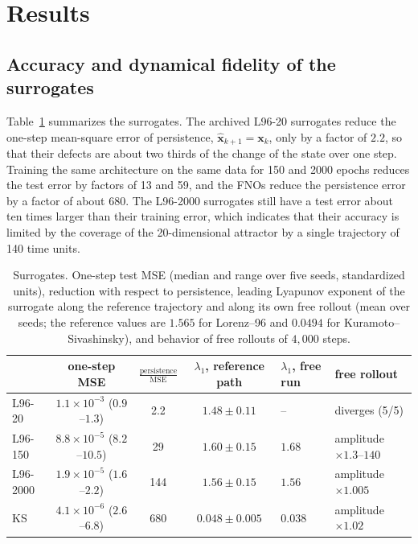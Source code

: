 \section{Results}
\label{sec:results}

\subsection{Accuracy and dynamical fidelity of the surrogates}
\label{sec:res_fidelity}

Table~\ref{tab:surrogates} summarizes the surrogates. The archived L96-20 surrogates reduce the one-step mean-square error of persistence, $\hat{\mathbf x}_{k+1}=\mathbf x_k$, only by a factor of $2.2$, so that their defects are about two thirds of the change of the state over one step. Training the same architecture on the same data for 150 and 2000 epochs reduces the test error by factors of 13 and 59, and the FNOs reduce the persistence error by a factor of about 680. The L96-2000 surrogates still have a test error about ten times larger than their training error, which indicates that their accuracy is limited by the coverage of the 20-dimensional attractor by a single trajectory of 140 time units.

\begin{table}[t]
\centering
\footnotesize
\caption{Surrogates. One-step test MSE (median and range over five seeds, standardized units), reduction with respect to persistence, leading Lyapunov exponent of the surrogate along the reference trajectory and along its own free rollout (mean over seeds; the reference values are $1.565$ for Lorenz--96 and $0.0494$ for Kuramoto--Sivashinsky), and behavior of free rollouts of $4{,}000$ steps.}
\label{tab:surrogates}
\begin{tabular}{lcccll}
\toprule
 & one-step MSE & $\frac{\text{persistence}}{\text{MSE}}$ & $\lambda_1$, reference path & $\lambda_1$, free run & free rollout\\
\midrule
L96-20   & $1.1\times10^{-3}$ ($0.9$--$1.3$) & 2.2 & $1.48\pm0.11$ & -- & diverges (5/5)\\
L96-150  & $8.8\times10^{-5}$ ($8.2$--$10.5$) & 29 & $1.60\pm0.15$ & $1.68$ & amplitude $\times1.3$--$140$\\
L96-2000 & $1.9\times10^{-5}$ ($1.6$--$2.2$) & 144 & $1.56\pm0.15$ & $1.56$ & amplitude $\times1.005$\\
KS       & $4.1\times10^{-6}$ ($2.6$--$6.8$) & 680 & $0.048\pm0.005$ & $0.038$ & amplitude $\times1.02$\\
\bottomrule
\end{tabular}
\end{table}

